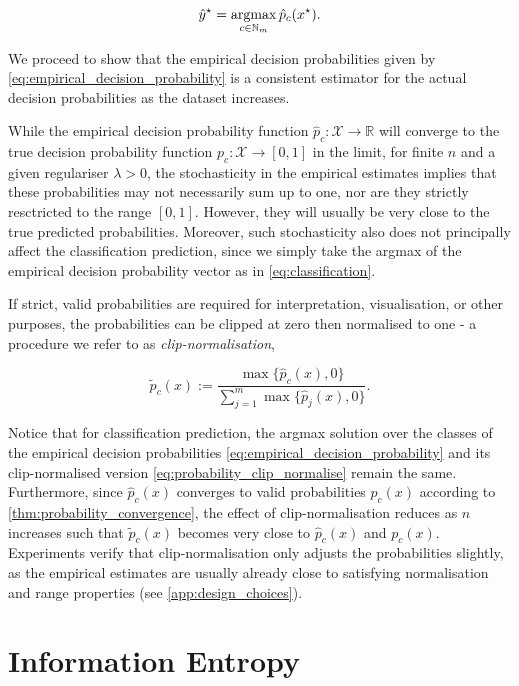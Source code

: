 \documentclass{article}
\newcommand{\argmax}{\operatornamewithlimits{argmax}}
\begin{document}
	\begin{equation}
		\hat{y}^{\star} = \argmax_{c \in \mathbb{N}_{m}} \hat{p}_{c}(x^{\star}).
	\label{eq:classification}
	\end{equation}

	We proceed to show that the empirical decision probabilities given by \eqref{eq:empirical_decision_probability} is a consistent estimator for the actual decision probabilities as the dataset increases.
	
	While the empirical decision probability function $\hat{p}_{c} : \mathcal{X} \to \mathbb{R}$ will converge to the true decision probability function  $p_{c} : \mathcal{X} \to [0, 1]$ in the limit, for finite $n$ and a given regulariser $\lambda > 0$, the stochasticity in the empirical estimates implies that these probabilities may not necessarily sum up to one, nor are they strictly resctricted to the range $[0, 1]$. However, they will usually be very close to the true predicted probabilities. Moreover, such stochasticity also does not principally affect the classification prediction, since we simply take the argmax of the empirical decision probability vector as in \eqref{eq:classification}.
	
	If strict, valid probabilities are required for interpretation, visualisation, or other purposes, the probabilities can be clipped at zero then normalised to one - a procedure we refer to as \textit{clip-normalisation},
	
	\begin{equation}
		\tilde{p}_{c}(x) := \frac{\max\{\hat{p}_{c}(x), 0\}}{\sum_{j = 1}^{m} \max\{\hat{p}_{j}(x), 0\}}.
	\label{eq:probability_clip_normalise}
	\end{equation}
	
	Notice that for classification prediction, the argmax solution over the classes of the empirical decision probabilities \eqref{eq:empirical_decision_probability} and its clip-normalised version \eqref{eq:probability_clip_normalise} remain the same. Furthermore, since $\hat{p}_{c}(x)$ converges to valid probabilities $p_{c}(x)$ according to \cref{thm:probability_convergence}, the effect of clip-normalisation reduces as $n$ increases such that $\tilde{p}_{c}(x)$ becomes very close to $\hat{p}_{c}(x)$ and $p_{c}(x)$. Experiments verify that clip-normalisation only adjusts the probabilities slightly, as the empirical estimates are usually already close to satisfying normalisation and range properties (see \cref{app:design_choices}).
	
\section{Information Entropy}
\label{sec:information_entropy}
\end{document}
